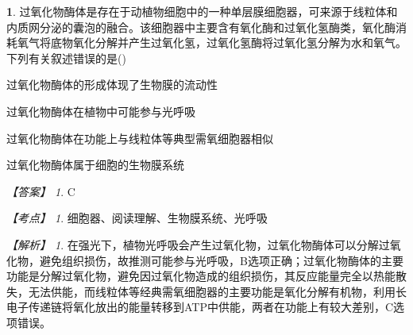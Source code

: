 \documentclass[UTF8, 10pt, a4paper, oneside]{ctexart}
\theoremstyle{definition}
\newtheorem{exercise}{}
\theoremstyle{remark}
\newtheorem*{answer}{【答案】}
\newtheorem*{point}{【考点】}      %
\newtheorem*{explanation}{【解析】}     %
\theoremstyle{plain}
\begin{document}
\begin{exercise}
过氧化物酶体是存在于动植物细胞中的一种单层膜细胞器，可来源于线粒体和内质网分泌的囊泡的融合。该细胞器中主要含有氧化酶和过氧化氢酶类，氧化酶消耗氧气将底物氧化分解并产生过氧化氢，过氧化氢酶将过氧化氢分解为水和氧气。下列有关叙述错误的是\quad(\quad)
    \begin{adjustwidth}{2em}{}
            \begin{asparaenum}[A. ]
                \item 过氧化物酶体的形成体现了生物膜的流动性
                \item 过氧化物酶体在植物中可能参与光呼吸
                \item 过氧化物酶体在功能上与线粒体等典型需氧细胞器相似
                \item 过氧化物酶体属于细胞的生物膜系统
            \end{asparaenum}
    \end{adjustwidth}
    \begin{answer}
        C
    \end{answer}
    \begin{point}
        细胞器、阅读理解、生物膜系统、光呼吸
    \end{point}
    \begin{explanation}
        在强光下，植物光呼吸会产生过氧化物，过氧化物酶体可以分解过氧化物，避免组织损伤，故推测可能参与光呼吸，B选项正确；过氧化物酶体的主要功能是分解过氧化物，避免因过氧化物造成的组织损伤，其反应能量完全以热能散失，无法供能，而线粒体等经典需氧细胞器的主要功能是氧化分解有机物，利用长电子传递链将氧化放出的能量转移到ATP中供能，两者在功能上有较大差别，C选项错误。
    \end{explanation}
\end{exercise}
\end{document}
